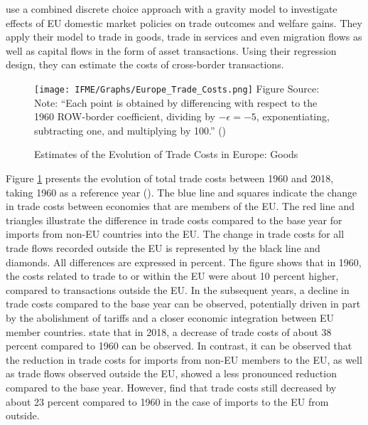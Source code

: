\textcite{US_Europe} use a combined discrete choice approach with a gravity model to investigate effects of EU domestic market policies on trade outcomes and welfare gains. They apply their model to trade in goods, trade in services and even migration flows as well as capital flows in the form of asset transactions. Using their regression design, they can estimate the costs of cross-border transactions.\begin{figure}[ht]
    \centering
    \caption[Estimates of the Evolution of Trade Costs in Europe: Goods]{Estimates of the Evolution of Trade Costs in Europe: Goods}
    \texttt{[image: IFME/Graphs/Europe\_Trade\_Costs.png]}
    \label{fig:EU_Trade_Costs}
    Figure Source: \cite{US_Europe}\\ Note: \enquote{Each point is obtained by differencing with respect to the 1960 ROW-border coefficient, dividing by $- \epsilon = -5$, exponentiating, subtracting one, and multiplying by 100.} (\cite{US_Europe})
\end{figure} Figure \ref{fig:EU_Trade_Costs} presents the evolution of total trade costs between 1960 and 2018, taking 1960 as a reference year (\cite{US_Europe}). The blue line and squares indicate the change in trade costs between economies that are members of the EU. The red line and triangles illustrate the difference in trade costs compared to the base year for imports from non-EU countries into the EU. The change in trade costs for all trade flows recorded outside the EU is represented by the black line and diamonds. All differences are expressed in percent. The figure shows that in 1960, the costs related to trade to or within the EU were about 10 percent higher, compared to transactions outside the EU. In the subsequent years, a decline in trade costs compared to the base year can be observed, potentially driven in part by the abolishment of tariffs and a closer economic integration between EU member countries. \textcite{US_Europe} state that in 2018, a decrease of trade costs of about 38 percent compared to 1960 can be observed. In contrast, it can be observed that the reduction in trade costs for imports from non-EU members to the EU, as well as trade flows observed outside the EU, showed a less pronounced reduction compared to the base year. However, \textcite{US_Europe} find that trade costs still decreased by about 23 percent compared to 1960 in the case of imports to the EU from outside. 

